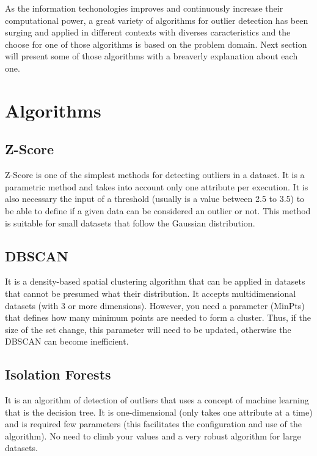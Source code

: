 As the information techonologies improves and continuously increase their computational 
power, a great variety of algorithms for outlier detection has been surging and 
applied in different contexts with diverses caracteristics and the choose for one 
of those algorithms is based on the problem domain. Next section will present some 
of those algorithms with a breaverly explanation about each one.


\section{Algorithms}

\subsection{Z-Score}

Z-Score is one of the simplest methods for detecting outliers in a dataset. It is a
parametric method and takes into account only one attribute per execution. It is also
necessary the input of a threshold (usually is a value between 2.5 to 3.5) to be able
to define if a given data can be considered an outlier or not. This method is suitable
for small datasets that follow the Gaussian distribution.

\subsection{DBSCAN}

It is a density-based spatial clustering algorithm that can be applied in datasets that
cannot be presumed what their distribution. It accepts multidimensional datasets (with
3 or more dimensions). However, you need a parameter (MinPts) that defines how many
minimum points are needed to form a cluster. Thus, if the size of the set change, this
parameter will need to be updated, otherwise the DBSCAN can become inefficient.

\subsection{Isolation Forests}

It is an algorithm of detection of outliers that uses a concept of machine learning that
is the decision tree. It is one-dimensional (only takes one attribute at a time) and is
required few parameters (this facilitates the configuration and use of the algorithm).
No need to climb your values and a very robust algorithm for large datasets.

